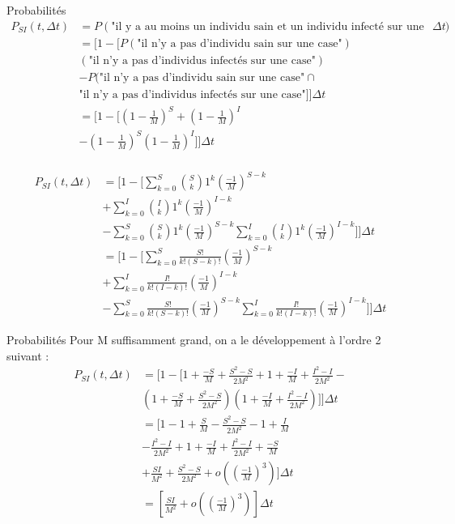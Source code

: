 \documentclass{beamer}
\theoremstyle{plain}
\theoremstyle{definition}
\theoremstyle{remark}
\begin{document}
\begin{frame}{Probabilités}
    \begin{align*}
P_{SI}(t, \Delta t) &= P(\text{"il y a au moins un individu sain et un individu infecté sur une case"})\Delta t \\
&=[1 - [P(\text{"il n'y a pas d'individu sain sur une case"}) \\
&(\text{"il n'y a pas d'individus infectés sur une case"})\\
&  - P(\text {"il n'y a pas d'individu sain sur une case"} \cap \\
&\text{"il n'y a pas d'individus infectés sur une case"}]]\Delta t \\
&=[1 - [(1 - \frac{1}{M})^S + (1 - \frac{1}{M})^I \\
&- (1 - \frac{1}{M})^S(1 - \frac{1}{M})^I]]\Delta t \\
\end{align*}
\end{frame}
\begin{frame}
\begin{align*}
P_{SI}(t, \Delta t) &=[1 - [\sum_{k=0}^{S} \binom{S}{k}1^k (\frac{-1}{M})^{S-k}  \\
& + \sum_{k=0}^{I} \binom{I}{k}1^k (\frac{-1}{M})^{I-k} \\
&- \sum_{k=0}^{S} \binom{S}{k}1^k (\frac{-1}{M})^{S-k}\sum_{k=0}^{I} \binom{I}{k}1^k (\frac{-1}{M})^{I-k}]]\Delta t \\
&= [1 - [\sum_{k=0}^{S} \frac{S!}{k!(S-k)!} (\frac{-1}{M})^{S-k}  \\
&+ \sum_{k=0}^{I} \frac{I!}{k!(I-k)!} (\frac{-1}{M})^{I-k} \\
&- \sum_{k=0}^{S} \frac{S!}{k!(S-k)!} (\frac{-1}{M})^{S-k}\sum_{k=0}^{I} \frac{I!}{k!(I-k)!} (\frac{-1}{M})^{I-k}]]\Delta t 
\end{align*}
    
\end{frame}
\begin{frame}{Probabilités}
Pour M suffisamment grand, on a le développement à l'ordre 2 suivant :
\begin{align*}
P_{SI}(t, \Delta t) &=[1 - [1 + \frac{-S}{M}+\frac{S^2-S}{2M^2}+1+\frac{-I}{M}+\frac{I^2-I}{2M^2}- \\
&(1+\frac{-S}{M}+\frac{S^2-S}{2M^2})(1+\frac{-I}{M}+\frac{I^2-I}{2M^2})]]\Delta t \\
&= [1 - 1 + \frac{S}{M} - \frac{S^2-S}{2M^2} - 1+\frac{I}{M} \\
&- \frac{I^2-I}{2M^2} +1+\frac{-I}{M}+\frac{I^2-I}{2M^2} +\frac{-S}{M} \\
&+ \frac{SI}{M^2}+\frac{S^2-S}{2M^2} + o((\frac{-1}{M})^3)]\Delta t \\
&=[\frac{SI}{M^2} +o((\frac{-1}{M})^3)] \Delta t\\
\end{align*}
\end{frame}{}
\end{document}

